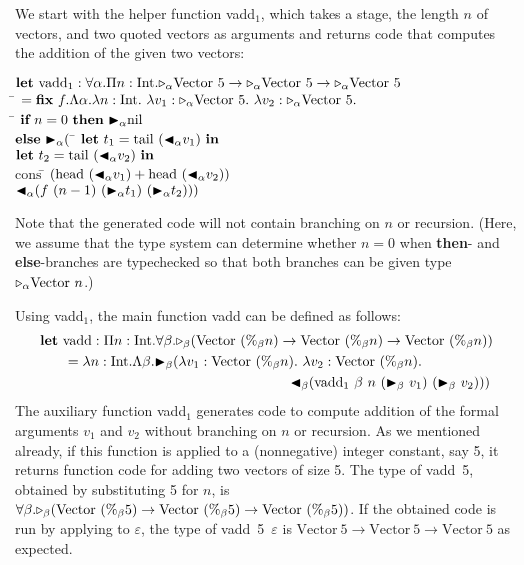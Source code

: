We start with the helper function vadd$_1$, which takes a stage, the length $n$ of vectors, and two quoted vectors as arguments and returns code that computes the addition of the given two vectors:
%
\begin{tabbing}
	  $\textbf{let}\ \text{vadd}_1 : \F\alpha.\Pi n:\I.\TW_\alpha\Vpn\to\TW_\alpha\Vpn\to\TW_\alpha\Vpn$                                \\
	  \hspace{6mm} \= $= \textbf{fix}\ f.\Lambda\alpha.\lambda n:\I.\ \lambda v_1:\TW_\alpha\Vpn.\ \lambda v_2:\TW_\alpha\Vpn.$            \\
	  \> \hspace{6mm} \= $\textbf{if}\ n = 0 \ \textbf{then}\ {\mathop{\blacktriangleright}}_\alpha \text{nil}$ \\
	  \>\> $\textbf{else}\ {\mathop{\blacktriangleright}}_\alpha ($ \= $\textbf{let}\ t_1 = \text{tail}\ ({\mathop{\blacktriangleleft}}_\alpha v_1)\ \textbf{in}$ \\
	  \>\>\> $\textbf{let}\ t_2 = \text{tail}\ ({\mathop{\blacktriangleleft}}_\alpha v_2)\ \textbf{in}$ \\
          \>\>\> $\text{cons}\ $\= $(\text{head}\ ({\mathop{\blacktriangleleft}}_\alpha v_1) + \text{head} \ ({\mathop{\blacktriangleleft}}_\alpha v_2))$ \\
          \>\>\>\> ${\mathop{\blacktriangleleft}}_\alpha (f\ (n-1)\ ({\mathop{\blacktriangleright}}_\alpha t_1)\ ({\mathop{\blacktriangleright}}_\alpha t_2)))$
\end{tabbing}
Note that the generated code will not contain branching on $n$ or recursion.
(Here, we assume that the type system can determine whether $n=0$ when
\textbf{then}- and \textbf{else}-branches are typechecked so that
both branches can be given type \({\mathop{\triangleright}}_\alpha \text{Vector }n\).)

Using vadd$_1$, the main function vadd can be defined as follows:
\renewcommand{\Vpn}{\text{Vector}\ (\%_\beta n)}
\begin{align*}
	  & \textbf{let}\ \text{vadd}: \Pi n:\I.\F\beta.\TW_\beta(\Vpn\to\Vpn\to\Vpn)                \\ 
	  & \hspace{6mm} = \lambda n:\I.\Lambda\beta.\TB_\beta (\lambda v_1:\Vpn.\ \lambda v_2:\Vpn. \\
	  & \hspace{63mm} \TBL_\beta (\text{vadd}_1\ \beta\ n\ (\TB_\beta\ v_1)\ (\TB_\beta\ v_2))) 
\end{align*}
\renewcommand{\Vpn}{\text{Vector}\ (\%_\beta 5)}%
The auxiliary function vadd$_1$ generates code to compute addition of
the formal arguments $v_1$ and $v_2$ without branching on $n$ or recursion.
As we mentioned already, if this function is applied to a
(nonnegative) integer constant, say 5, it returns function code for adding
two vectors of size 5.  The type of vadd\ 5, obtained by
substituting 5 for $n$, is
$\F\beta.\TW_\beta(\Vpn\to\Vpn\to\Vpn)$.
\renewcommand{\Vpn}{\text{Vector}\ 5}
If the obtained code is run by applying to \(\varepsilon\),
the type of vadd\ 5\ $\varepsilon$ is
\(\Vpn\to\Vpn\to\Vpn\) as expected.


